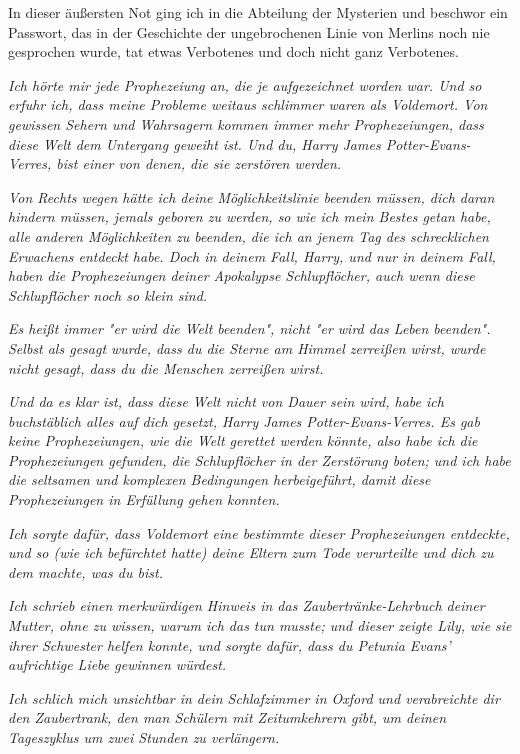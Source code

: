 {{In dieser äußersten Not ging ich in die Abteilung der Mysterien und beschwor ein Passwort, das in der Geschichte der ungebrochenen Linie von Merlins noch nie gesprochen wurde, tat etwas Verbotenes und doch nicht ganz Verbotenes.}

\emph{\hfill\break Ich hörte mir jede Prophezeiung an, die je aufgezeichnet worden war. Und so erfuhr ich, dass meine Probleme weitaus schlimmer waren als Voldemort. Von gewissen Sehern und Wahrsagern kommen immer mehr Prophezeiungen, dass diese Welt dem Untergang geweiht ist. Und du, Harry James Potter-Evans-Verres, bist einer von denen, die sie zerstören werden.}

\emph{Von Rechts wegen hätte ich deine Möglichkeitslinie beenden müssen, dich daran hindern müssen, jemals geboren zu werden, so wie ich mein Bestes getan habe, alle anderen Möglichkeiten zu beenden, die ich an jenem Tag des schrecklichen Erwachens entdeckt habe. Doch in deinem Fall, Harry, und nur in deinem Fall, haben die Prophezeiungen deiner Apokalypse Schlupflöcher, auch wenn diese Schlupflöcher noch so klein sind.}

\emph{\hfill\break Es heißt immer "er wird die Welt beenden", nicht "er wird das Leben beenden". Selbst als gesagt wurde, dass du die Sterne am Himmel zerreißen wirst, wurde nicht gesagt, dass du die Menschen zerreißen wirst.}

\emph{Und da es klar ist, dass diese Welt nicht von Dauer sein wird, habe ich buchstäblich alles auf dich gesetzt, Harry James Potter-Evans-Verres. Es gab keine Prophezeiungen, wie die Welt gerettet werden könnte, also habe ich die Prophezeiungen gefunden, die Schlupflöcher in der Zerstörung boten; und ich habe die seltsamen und komplexen Bedingungen herbeigeführt, damit diese Prophezeiungen in Erfüllung gehen konnten.}

\emph{\hfill\break Ich sorgte dafür, dass Voldemort eine bestimmte dieser Prophezeiungen entdeckte, und so (wie ich befürchtet hatte) deine Eltern zum Tode verurteilte und dich zu dem machte, was du bist.}

\emph{Ich schrieb einen merkwürdigen Hinweis in das Zaubertränke-Lehrbuch deiner Mutter, ohne zu wissen, warum ich das tun musste; und dieser zeigte Lily, wie sie ihrer Schwester helfen konnte, und sorgte dafür, dass du Petunia Evans' aufrichtige Liebe gewinnen würdest.}

\emph{Ich schlich mich unsichtbar in dein Schlafzimmer in Oxford und verabreichte dir den Zaubertrank, den man Schülern mit Zeitumkehrern gibt, um deinen Tageszyklus um zwei Stunden zu verlängern.}

}

